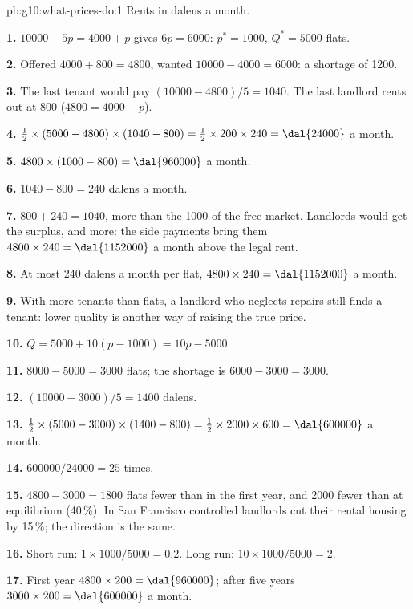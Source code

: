\begin{solution}{pb:g10:what-prices-do:1}
Rents in dalens a month.

\textbf{1.} $10000 - 5p = 4000 + p$ gives $6p = 6000$: $p^* = 1000$, $Q^* = 5000$ flats.

\textbf{2.} Offered $4000 + 800 = 4800$, wanted $10000 - 4000 = 6000$: a shortage of 1200.

\textbf{3.} The last tenant would pay $(10000 - 4800)/5 = 1040$. The last landlord rents out at 800 ($4800 = 4000 + p$).

\textbf{4.} $\tfrac12 \times (5000 - 4800) \times (1040 - 800) = \tfrac12 \times 200 \times 240 = \text{\dal{24000}}$ a month.

\textbf{5.} $4800 \times (1000 - 800) = \text{\dal{960000}}$ a month.

\textbf{6.} $1040 - 800 = 240$ dalens a month.

\textbf{7.} $800 + 240 = 1040$, more than the 1000 of the free market. Landlords would get the surplus, and more: the side payments bring them $4800 \times 240 = \text{\dal{1152000}}$ a
month above the legal rent.

\textbf{8.} At most 240 dalens a month per flat, $4800 \times 240 = \text{\dal{1152000}}$ a month.

\textbf{9.} With more tenants than flats, a landlord who neglects repairs still finds a tenant: lower quality is another way of raising the true price.

\textbf{10.} $Q = 5000 + 10(p - 1000) = 10p - 5000$.

\textbf{11.} $8000 - 5000 = 3000$ flats; the shortage is $6000 - 3000 = 3000$.

\textbf{12.} $(10000 - 3000)/5 = 1400$ dalens.

\textbf{13.} $\tfrac12 \times (5000 - 3000) \times (1400 - 800) = \tfrac12 \times 2000 \times 600 = \text{\dal{600000}}$ a month.

\textbf{14.} $600000/24000 = 25$ times.

\textbf{15.} $4800 - 3000 = 1800$ flats fewer than in the first year, and \num{2000} fewer than at equilibrium (40\,\%). In San Francisco controlled landlords cut their rental housing by
15\,\%; the direction is the same.

\textbf{16.} Short run: $1 \times 1000/5000 = 0.2$. Long run: $10 \times 1000/5000 = 2$.

\textbf{17.} First year $4800 \times 200 = \text{\dal{960000}}$; after five years $3000 \times 200 = \text{\dal{600000}}$ a month.


\end{solution}
